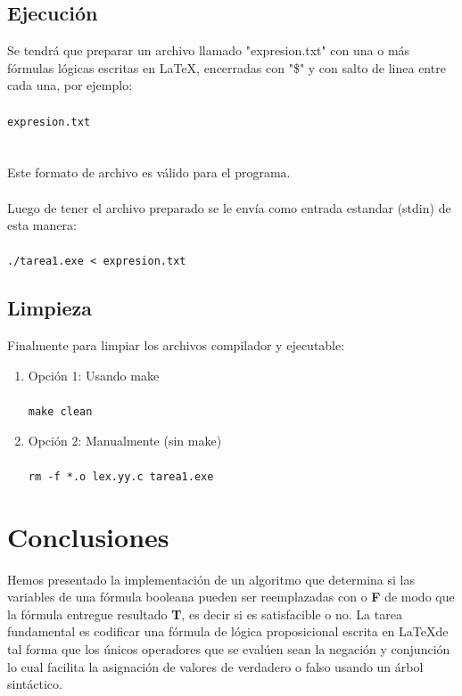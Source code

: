 \documentclass{report}
\begin{document}
	\subsection{Ejecuci\'on}
	Se tendr\'a que preparar un archivo llamado "expresion.txt" con una o m\'as f\'ormulas l\'ogicas escritas en \LaTeX, encerradas con "\$" y con salto de linea entre cada una, por ejemplo: \\\\
	\texttt{expresion.txt} \\
	 \\\\
	Este formato de archivo es v\'alido para el programa. \\\\
	Luego de tener el archivo preparado se le env\'ia como entrada estandar (stdin) de esta manera: \\\\
	\texttt{./tarea1.exe < expresion.txt}
	\subsection{Limpieza}
	Finalmente para limpiar los archivos compilador y ejecutable:
	\begin{enumerate}
		\item Opci\'on 1: Usando make \\\\\texttt{make clean}
		\item Opci\'on 2: Manualmente (sin make) \\\\
		\texttt{rm -f *.o lex.yy.c tarea1.exe}
	\end{enumerate}
	\section{Conclusiones}
	Hemos presentado la implementaci\'on de un algoritmo que determina si las variables de una f\'ormula booleana pueden ser reemplazadas con 	o \textbf{F} de modo que la f\'ormula entregue resultado \textbf{T}, es decir si es satisfacible o no. La tarea fundamental es codificar una f\'ormula de l\'ogica proposicional escrita en \LaTeX de tal forma que los \'unicos operadores que se eval\'uen sean la negaci\'on y conjunci\'on lo cual facilita la asignaci\'on de valores de verdadero o falso usando un \'arbol sint\'actico.
\end{document}
